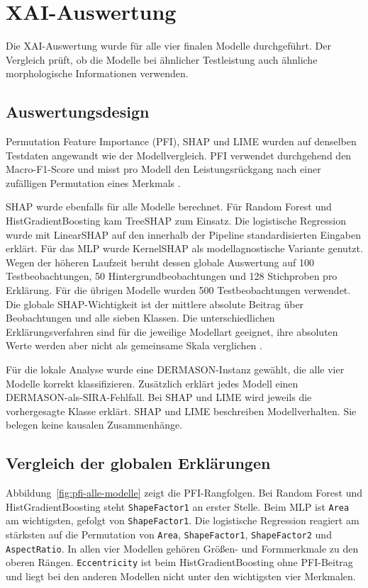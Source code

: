 \chapter{XAI-Auswertung}\label{chap:XAI-Methoden}

Die XAI-Auswertung wurde für alle vier finalen Modelle durchgeführt. Der Vergleich prüft, ob die Modelle bei ähnlicher Testleistung auch ähnliche morphologische Informationen verwenden.

\section{Auswertungsdesign}

Permutation Feature Importance (PFI), SHAP und LIME wurden auf denselben Testdaten angewandt wie der Modellvergleich. PFI verwendet durchgehend den Macro-F1-Score und misst pro Modell den Leistungsrückgang nach einer zufälligen Permutation eines Merkmals \cite[Kap.~23]{molnar2025interpretable}.

SHAP wurde ebenfalls für alle Modelle berechnet. Für Random Forest und HistGradientBoosting kam TreeSHAP zum Einsatz. Die logistische Regression wurde mit LinearSHAP auf den innerhalb der Pipeline standardisierten Eingaben erklärt. Für das MLP wurde KernelSHAP als modellagnostische Variante genutzt. Wegen der höheren Laufzeit beruht dessen globale Auswertung auf 100 Testbeobachtungen, 50 Hintergrundbeobachtungen und 128 Stichproben pro Erklärung. Für die übrigen Modelle wurden 500 Testbeobachtungen verwendet. Die globale SHAP-Wichtigkeit ist der mittlere absolute Beitrag über Beobachtungen und alle sieben Klassen. Die unterschiedlichen Erklärungsverfahren sind für die jeweilige Modellart geeignet, ihre absoluten Werte werden aber nicht als gemeinsame Skala verglichen \cite[Kap.~18]{molnar2025interpretable}.

Für die lokale Analyse wurde eine DERMASON-Instanz gewählt, die alle vier Modelle korrekt klassifizieren. Zusätzlich erklärt jedes Modell einen DERMASON-als-SIRA-Fehlfall. Bei SHAP und LIME wird jeweils die vorhergesagte Klasse erklärt. SHAP und LIME beschreiben Modellverhalten. Sie belegen keine kausalen Zusammenhänge.

\section{Vergleich der globalen Erklärungen}

Abbildung~\ref{fig:pfi-alle-modelle} zeigt die PFI-Rangfolgen. Bei Random Forest und HistGradientBoosting steht \texttt{ShapeFactor1} an erster Stelle. Beim MLP ist \texttt{Area} am wichtigsten, gefolgt von \texttt{ShapeFactor1}. Die logistische Regression reagiert am stärksten auf die Permutation von \texttt{Area}, \texttt{ShapeFactor1}, \texttt{ShapeFactor2} und \texttt{AspectRatio}. In allen vier Modellen gehören Größen- und Formmerkmale zu den oberen Rängen. \texttt{Eccentricity} ist beim HistGradientBoosting ohne PFI-Beitrag und liegt bei den anderen Modellen nicht unter den wichtigsten vier Merkmalen.

